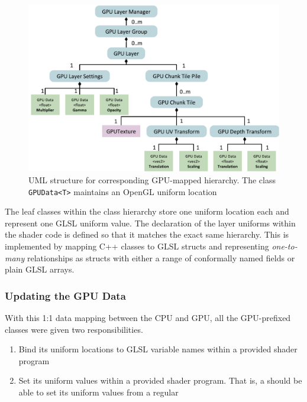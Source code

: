 \begin{figure}[htbp]
    \centering
    \includegraphics[width=\textwidth]{figures/implementation/layers/gpulayermanager.pdf}
    \caption{UML structure for corresponding GPU-mapped hierarchy. The class \texttt{GPUData<T>} maintains an OpenGL uniform location}
    \label{fig:gpulayermanager}
\end{figure}

The leaf classes within the class hierarchy store one uniform location each and represent one GLSL uniform value. The declaration of the layer uniforms within the shader code is defined so that it matches the exact same hierarchy. This is implemented by mapping C++ classes to GLSL structs and representing \emph{one-to-many} relationships as structs with either a range of conformally named fields or plain GLSL arrays.

\subsubsection{Updating the GPU Data}

With this 1:1 data mapping between the CPU and GPU, all the GPU-prefixed classes were given two responsibilities.

\begin{enumerate}
\item Bind its uniform locations to GLSL variable names within a provided shader program
\item Set its uniform values within a provided shader program. That is, a  should be able to set its uniform values from a regular 
\end{enumerate}

